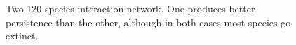 \begin{figure}
	\centering	
	\renewcommand{\thesubfigure}{}
	\setlength{\subfloatlabelskip}{0pt}
	\caption{Two 120 species interaction network. One produces better persistence than the other, although in both cases most species go extinct.}
	\label{fig:good_bad_nets_120}
\end{figure}

